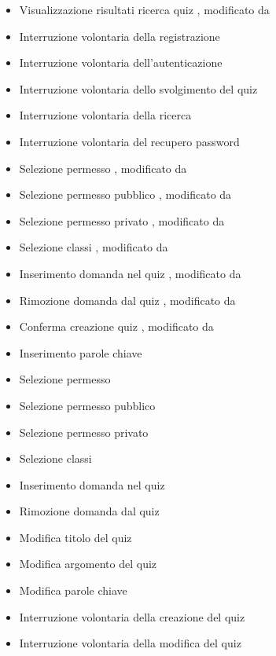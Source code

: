 \begin{itemize}
	\item {} Visualizzazione risultati ricerca quiz , modificato da 
	\item {} Interruzione volontaria della registrazione 
	\item {} Interruzione volontaria dell'autenticazione
	\item {} Interruzione volontaria dello svolgimento del quiz
	\item {} Interruzione volontaria della ricerca
	\item {} Interruzione volontaria del recupero password
	\item {} Selezione permesso , modificato da 
	\item {} Selezione permesso pubblico , modificato da 
	\item {} Selezione permesso privato , modificato da 
	\item {} Selezione classi , modificato da 
	\item {} Inserimento domanda nel quiz , modificato da 
	\item {} Rimozione domanda dal quiz , modificato da 
	\item {} Conferma creazione quiz , modificato da 
	\item {} Inserimento parole chiave 
	\item {} Selezione permesso
	\item {} Selezione permesso pubblico
	\item {} Selezione permesso privato
	\item {} Selezione classi
	\item {} Inserimento domanda nel quiz
	\item {} Rimozione domanda dal quiz
	\item {} Modifica titolo del quiz
	\item {} Modifica argomento del quiz
	\item {} Modifica parole chiave 
	\item {} Interruzione volontaria della creazione del quiz
	\item {} Interruzione volontaria della modifica del quiz

\end{itemize}

